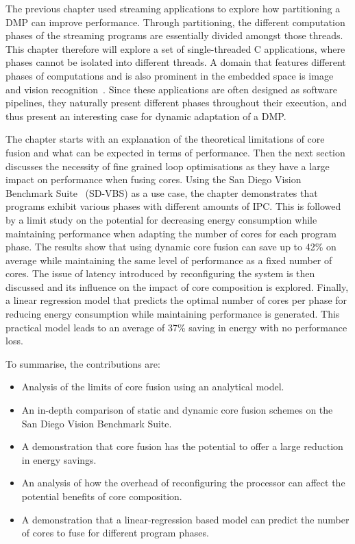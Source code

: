 The previous chapter used streaming applications to explore how partitioning a DMP can improve performance.
Through partitioning, the different computation phases of the streaming programs are essentially divided amongst those threads.
This chapter therefore will explore a set of single-threaded C applications, where phases cannot be isolated into different threads.
A domain that features different phases of computations and is also prominent in the embedded space is image and vision recognition~\cite{sd-vbs}.
Since these applications are often designed as software pipelines, they naturally present different phases throughout their execution, and thus present an interesting case for dynamic adaptation of a DMP.

The chapter starts with an explanation of the theoretical limitations of core fusion and what can be expected in terms of performance.
Then the next section discusses the necessity of fine grained loop optimisations as they have a large impact on performance when fusing cores.
Using the San Diego Vision Benchmark Suite~\cite{sdvbs} (SD-VBS) as a use case, the chapter demonstrates that programs exhibit various phases with different amounts of IPC.
This is followed by a limit study on the potential for decreasing energy consumption while maintaining performance when adapting the number of cores for each program phase.
The results show that using dynamic core fusion can save up to 42\% on average while maintaining the same level of performance as a fixed number of cores.
The issue of latency introduced by reconfiguring the system is then discussed and its influence on the impact of core composition is explored.
Finally, a linear regression model that predicts the optimal number of cores per phase for reducing energy consumption while maintaining performance is generated.
This practical model leads to an average of 37\% saving in energy with no performance loss.

To summarise, the contributions are:

\begin{itemize}
\item Analysis of the limits of core fusion using an analytical model.
\vspace{-1em}
\item An in-depth comparison of static and dynamic core fusion schemes on the San Diego Vision Benchmark Suite.
\vspace{-1em}
\item A demonstration that core fusion has the potential to offer a large reduction in energy savings.
\vspace{-1em}
\item An analysis of how the overhead of reconfiguring the processor can affect the potential benefits of core composition.
\vspace{-1em}
\item A demonstration that a linear-regression based model can predict the number of cores to fuse for different program phases.
\end{itemize}
